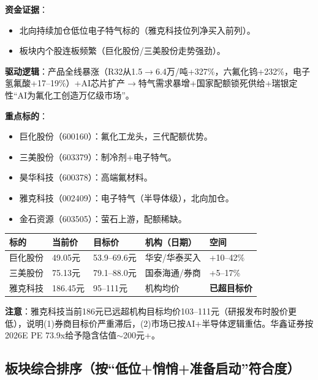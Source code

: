 \documentclass[a4paper,11pt,fontset=none]{ctexart}
\begin{document}
\textbf{资金证据}：
\begin{itemize}
  \item 北向持续加仓低位电子特气标的（雅克科技位列净买入前列）。
  \item 板块内个股连板频繁（巨化股份/三美股份走势强劲）。
\end{itemize}

\textbf{驱动逻辑}：产品全线暴涨（R32从1.5$\to$6.4万/吨+327\%，六氟化钨+232\%，电子氢氟酸+17--19\%）+AI芯片扩产$\to$特气需求暴增+国家配额锁死供给+瑞银定性``AI为氟化工创造万亿级市场''。

\textbf{重点标的}：
\begin{itemize}
  \item 巨化股份（600160）：氟化工龙头，三代配额优势。
  \item 三美股份（603379）：制冷剂+电子特气。
  \item 昊华科技（600378）：高端氟材料。
  \item 雅克科技（002409）：电子特气（半导体级），北向加仓。
  \item 金石资源（603505）：萤石上游，配额稀缺。
\end{itemize}

\begin{tabularx}{\textwidth}{L{2.5cm}L{2cm}L{2.5cm}L{3cm}X}
\toprule
\textbf{标的} & \textbf{当前价} & \textbf{目标价} & \textbf{机构（日期）} & \textbf{空间} \\
\midrule
巨化股份 & 49.05元 & 53.9--69.6元 & 华安/华泰买入 & +10--42\% \\
三美股份 & 75.13元 & 79.1--88.0元 & 国泰海通/券商 & +5--17\% \\
雅克科技 & 186.45元 & 95--111元 & 机构均价 & \textbf{已超目标价} \\
\bottomrule
\end{tabularx}

\textbf{注意}：雅克科技当前186元已远超机构目标均价103--111元（研报发布时股价更低），说明(1)券商目标价严重滞后，(2)市场已按AI+半导体逻辑重估。华鑫证券按2026E PE 73.9x给予隐含估值$\sim$200元+。

\subsection*{板块综合排序（按``低位+悄悄+准备启动''符合度）}
\end{document}
